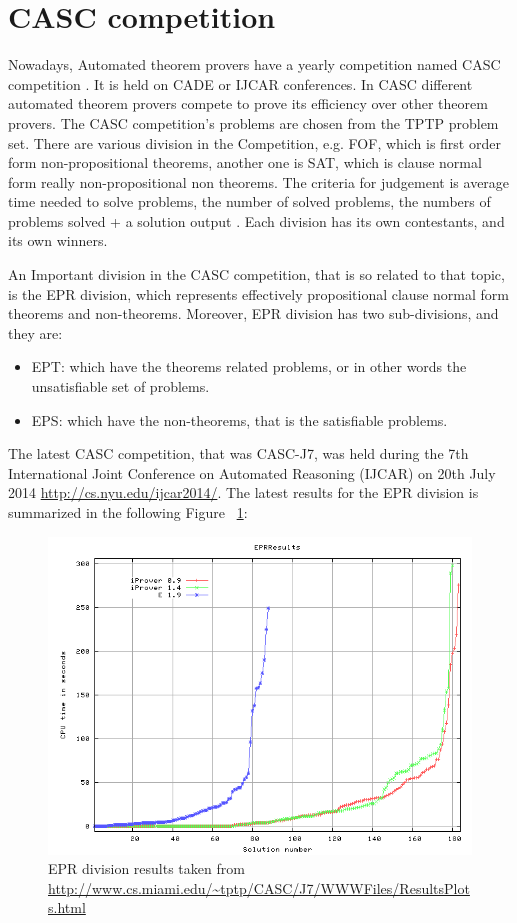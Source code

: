 \section{CASC competition}
Nowadays, Automated theorem provers have a yearly competition named CASC competition \cite{CASC02,CASC06}. It is held on CADE or IJCAR conferences. In CASC different automated theorem provers compete to prove its efficiency over other theorem provers. The CASC competition's problems are chosen from the TPTP problem set. There are various division in the Competition, e.g. FOF, which is first order form non-propositional theorems, another one is SAT, which is clause normal form really non-propositional non theorems.
The criteria for judgement is average time needed to solve problems, the number of solved problems, the numbers of problems solved + a solution output . Each division has its own contestants, and its own winners.


An Important division in the CASC competition, that is so related to that topic, is the EPR division, which represents effectively propositional clause normal form theorems and non-theorems. Moreover, EPR division has two sub-divisions, and they are:
	\begin{itemize}
		\item EPT: which have the theorems related problems, or in other words the unsatisfiable set of problems.
		\item EPS: which have the non-theorems, that is the satisfiable problems.
	\end{itemize}
	

The latest CASC competition, that was CASC-J7, was held during the 7th International Joint Conference on Automated Reasoning (IJCAR) on 20th July 2014 \url{http://cs.nyu.edu/ijcar2014/}. The latest results for the EPR division is summarized in the following Figure ~\ref{fig:epr_casc_results}:

	\begin{figure}[H]
		\centering
		\includegraphics[scale=0.5]{pictures/EPRResults-Proof-Time.png}
		\caption{EPR division results taken from \url{http://www.cs.miami.edu/~tptp/CASC/J7/WWWFiles/ResultsPlots.html} \label{fig:epr_casc_results}}
	\end{figure}



